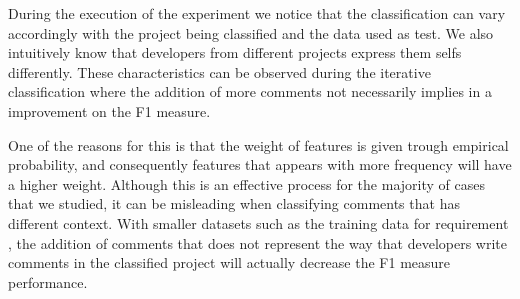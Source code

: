 During the execution of the experiment we notice that the classification can vary accordingly with the project being classified and the data used as test. We also intuitively know that developers from different projects express them selfs differently. These characteristics can be observed during the iterative classification where the addition of more comments not necessarily implies in a improvement on the F1 measure.

One of the reasons for this is that the weight of features is given trough empirical probability, and consequently features that appears with more frequency will have a higher weight. Although this is an effective process for the majority of cases that we studied, it can be misleading when classifying comments that has different context. With smaller datasets such as the training data for requirement \SATD, the addition of comments that does not represent the way that developers write comments in the classified project will actually decrease the F1 measure performance. 

